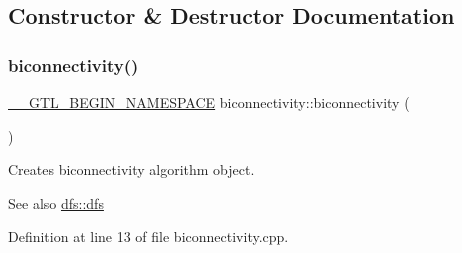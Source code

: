 \subsection{Constructor \& Destructor Documentation}
\mbox{\label{classbiconnectivity_a2ac204c72d74090e4e24e83a98351f6a}} 
\subsubsection{\texorpdfstring{biconnectivity()}{biconnectivity()}}
{\footnotesize\ttfamily \mbox{\hyperlink{_g_t_l_8h_a2d9f24096ac60918452dd51f32b64aa9}{\+\_\+\+\_\+\+G\+T\+L\+\_\+\+B\+E\+G\+I\+N\+\_\+\+N\+A\+M\+E\+S\+P\+A\+CE}} biconnectivity\+::biconnectivity (\begin{DoxyParamCaption}{ }\end{DoxyParamCaption})}



Creates biconnectivity algorithm object. 

\begin{DoxySeeAlso}{See also}
\mbox{\hyperlink{classdfs_afe4e213d3f1f88a4ff57b2d72de232f4}{dfs\+::dfs}} 
\end{DoxySeeAlso}


Definition at line 13 of file biconnectivity.\+cpp.


